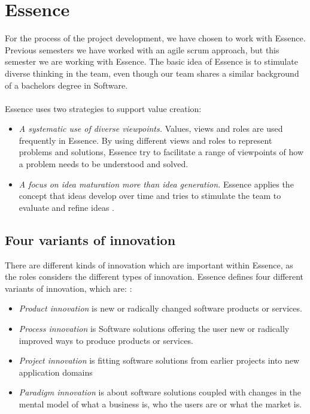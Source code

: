 \section{Essence}
For the process of the project development, we have chosen to work with Essence. 
Previous semesters we have worked with an agile scrum approach, but this semester we are working with Essence.
The basic idea of Essence is to stimulate diverse thinking in the team, even though our team shares a similar background of a bachelors degree in Software.
\\\\
Essence uses two strategies to support value creation:
\begin{itemize}
    \item \textit{A systematic use of diverse viewpoints.} 
    Values, views and roles are used frequently in Essence. 
    By using different views and roles to represent problems and solutions, Essence try to facilitate a range of viewpoints of how a problem needs to be understood and solved.
    \item \textit{A focus on idea maturation more than idea generation.}
    Essence applies the concept that ideas develop over time and tries to stimulate the team to evaluate and refine ideas \autocite{Essence}.
\end{itemize}

\subsection{Four variants of innovation}
There are different kinds of innovation which are important within Essence, as the roles considers the different types of innovation. 
Essence defines four different variants of innovation, which are: \autocite{Essence}:
\begin{itemize}
    \item \textit{Product innovation} is new or radically changed software products or services. 
    \item \textit{Process innovation} is Software solutions offering the user new or radically improved ways to produce products or services.
    \item \textit{Project innovation} is fitting software solutions from earlier projects into new application domains
    \item \textit{Paradigm innovation} is about software solutions coupled with changes in the mental model of what a business is, who the users are or what the market is.
\end{itemize}

